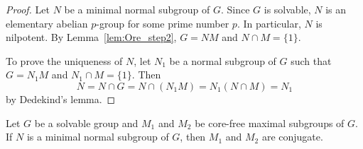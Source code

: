 \begin{proof}
    Let $N$ be a minimal normal subgroup of $G$. Since $G$ is solvable, 
    $N$ is an elementary abelian $p$-group for some prime number $p$. 
    In particular, $N$ is nilpotent. By Lemma~\ref{lem:Ore_step2}, 
    $G=NM$ and $N\cap M=\{1\}$. 

    To prove the uniqueness of $N$, let $N_1$ be a normal
    subgroup of $G$ such that $G=N_1M$ and $N_1\cap M=\{1\}$. Then
    \[
    N=N\cap G=N\cap (N_1M)=N_1(N\cap M)=N_1
    \]
    by Dedekind's lemma. 
\end{proof}

\begin{lemma}
    \label{lem:Ore_step3}
    Let $G$ be a solvable group and $M_1$ and $M_2$ be core-free 
    maximal subgroups of $G$. If $N$ is a minimal normal subgroup of $G$, then
    $M_1$ and $M_2$ are conjugate. 
\end{lemma}

